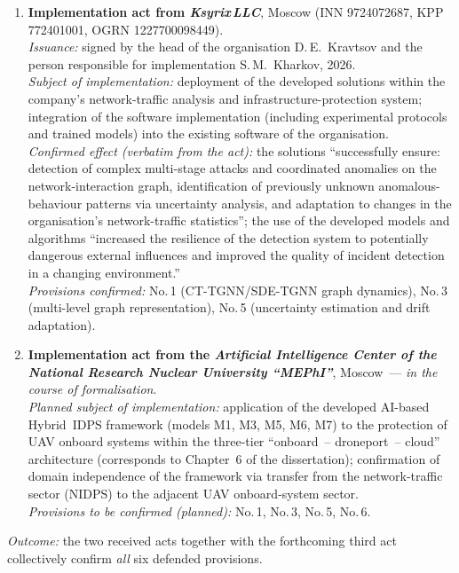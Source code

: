 \documentclass[11pt,a4paper]{article}
\begin{document}
\begin{enumerate}[leftmargin=*, itemsep=0.5em]
\item \textbf{Implementation act from \emph{Ksyrix\,LLC}}, Moscow (INN 9724072687, KPP 772401001, OGRN 1227700098449). \\
\textit{Issuance:} signed by the head of the organisation D.\,E.~Kravtsov and the person responsible for implementation S.\,M.~Kharkov, 2026. \\
\textit{Subject of implementation:} deployment of the developed solutions within the company's network-traffic analysis and infrastructure-protection system; integration of the software implementation (including experimental protocols and trained models) into the existing software of the organisation. \\
\textit{Confirmed effect (verbatim from the act):} the solutions ``successfully ensure: detection of complex multi-stage attacks and coordinated anomalies on the network-interaction graph, identification of previously unknown anomalous-behaviour patterns via uncertainty analysis, and adaptation to changes in the organisation's network-traffic statistics''; the use of the developed models and algorithms ``increased the resilience of the detection system to potentially dangerous external influences and improved the quality of incident detection in a changing environment.'' \\
\textit{Provisions confirmed:} No.\,1 (CT-TGNN/SDE-TGNN graph dynamics), No.\,3 (multi-level graph representation), No.\,5 (uncertainty estimation and drift adaptation).

\item \textbf{Implementation act from the \emph{Artificial Intelligence Center of the National Research Nuclear University ``MEPhI''}}, Moscow~--- \emph{in the course of formalisation}. \\
\textit{Planned subject of implementation:} application of the developed AI-based Hybrid~IDPS framework (models M1, M3, M5, M6, M7) to the protection of UAV onboard systems within the three-tier ``onboard~-- droneport~-- cloud'' architecture (corresponds to Chapter~6 of the dissertation); confirmation of domain independence of the framework via transfer from the network-traffic sector (NIDPS) to the adjacent UAV onboard-system sector. \\
\textit{Provisions to be confirmed (planned):} No.\,1, No.\,3, No.\,5, No.\,6.

\end{enumerate}

\textit{Outcome:} the two received acts together with the forthcoming third act collectively confirm \emph{all} six defended provisions.
\end{document}
